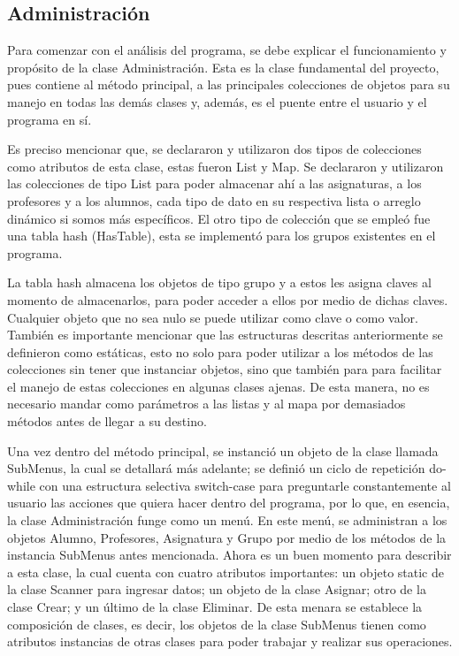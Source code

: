\documentclass[11pt]{article}
\begin{document}
\subsection{Administración}
\par
Para comenzar con el análisis del programa, se debe explicar el 
funcionamiento y propósito de la clase Administración. Esta es la 
clase fundamental del proyecto, pues contiene al método principal, a 
las principales colecciones de objetos para su manejo en todas las 
demás clases y, además, es el puente entre el usuario y el programa 
en sí.
\par
Es preciso mencionar que, se declararon y utilizaron dos tipos 
de colecciones como atributos de esta clase, estas fueron List y Map. 
Se declararon y utilizaron las colecciones de tipo List para poder 
almacenar ahí a las asignaturas, a los profesores y a los alumnos, 
cada tipo de dato en su respectiva lista o arreglo dinámico si somos 
más específicos. El otro tipo de colección que se empleó fue una 
tabla hash (HasTable), esta se implementó para los grupos existentes 
en el programa. 
\par
La tabla hash almacena los objetos de tipo grupo y a 
estos les asigna claves al momento de almacenarlos, para poder 
acceder a ellos por medio de dichas claves. Cualquier objeto que no 
sea nulo se puede utilizar como clave o como valor. También es 
importante mencionar que las estructuras descritas anteriormente se 
definieron como estáticas, esto no solo para poder utilizar a los 
métodos de las colecciones sin tener que instanciar objetos, sino que 
también para para facilitar el manejo de estas colecciones en algunas 
clases ajenas. De esta manera, no es necesario mandar como parámetros 
a las listas y al mapa por demasiados métodos antes de llegar a su 
destino. 
\par
Una vez dentro del método principal, se instanció un objeto de la 
clase llamada SubMenus, la cual se detallará más adelante; se definió 
un ciclo de repetición do-while con una estructura selectiva switch-case 
para preguntarle constantemente al usuario las acciones que 
quiera hacer dentro del programa, por lo que, en esencia, la clase 
Administración funge como un menú. En este menú, se administran a los 
objetos Alumno, Profesores, Asignatura y Grupo por medio de los 
métodos de la instancia SubMenus antes mencionada. Ahora es un buen 
momento para describir a esta clase, la cual cuenta con cuatro 
atributos importantes: un objeto static de la clase Scanner para 
ingresar datos; un objeto de la clase Asignar; otro de la clase 
Crear; y un último de la clase Eliminar. De esta menara se establece 
la composición de clases, es decir, los objetos de la clase SubMenus 
tienen como atributos instancias de otras clases para poder trabajar 
y realizar sus operaciones. 
\end{document}
